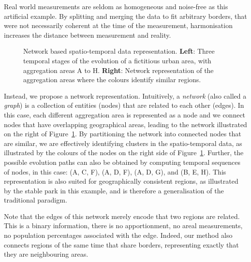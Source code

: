 Real world measurements are seldom as homogeneous and noise-free as this
artificial example. By splitting and merging the data to fit arbitrary borders,
that were not necessarily coherent at the time of the measurement, harmonisation
increases the distance between measurement and reality.


\begin{figure}
    \centering 
     \caption{Network based spatio-temporal data representation. \textbf{Left}:
    Three temporal stages of the evolution of a fictitious urban area, with
    aggregation areas A to H. \textbf{Right}: Network representation of the
    aggregation areas where the colours identify similar regions.
        \label{fig:intuition}}
\end{figure}

Instead, we propose a network representation. Intuitively, a \emph{network}
(also called a \emph{graph}) is a collection of entities (nodes) that are
related to each other (edges). In this case, each different aggregation area is
represented as a node and we connect nodes that have overlapping geographical
areas, leading to the network illustrated on the right of
Figure~\ref{fig:intuition}. By partitioning the network into connected nodes
that are similar, we are effectively identifying clusters in the spatio-temporal
data, as illustrated by the colours of the nodes on the right side of
Figure~\ref{fig:intuition}. Further, the possible evolution paths can also be
obtained by computing temporal sequences of nodes, in this case: (A, C, F), (A,
D, F), (A, D, G), and (B, E, H). This representation is also suited for
geographically consistent regions, as illustrated by the stable park in this
example, and is therefore a generalisation of the traditional paradigm.

Note that the edges of this network merely encode that two regions are related.
This is a binary information, there is no apportionment, no areal measurements,
no population percentages associated with the edge. Indeed, our method also
connects regions of the same time that share borders, representing exactly that
they are neighbouring areas.
